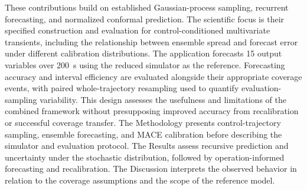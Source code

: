 These contributions build on established Gaussian-process sampling, recurrent forecasting, and normalized conformal prediction. The scientific focus is their specified construction and evaluation for control-conditioned multivariate transients, including the relationship between ensemble spread and forecast error under different calibration distributions. The application forecasts 15 output variables over 200~s using the reduced simulator as the reference. Forecasting accuracy and interval efficiency are evaluated alongside their appropriate coverage events, with paired whole-trajectory resampling used to quantify evaluation-sampling variability. This design assesses the usefulness and limitations of the combined framework without presupposing improved accuracy from recalibration or successful coverage transfer. The Methodology presents control-trajectory sampling, ensemble forecasting, and MACE calibration before describing the simulator and evaluation protocol. The Results assess recursive prediction and uncertainty under the stochastic distribution, followed by operation-informed forecasting and recalibration. The Discussion interprets the observed behavior in relation to the coverage assumptions and the scope of the reference model.
